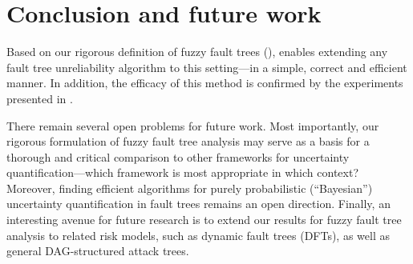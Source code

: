 \documentclass[runningheads]{llncs}
\newcommand{\MS}[1]{{\color{blue}\textbf{Mariëlle:} #1}}
\begin{document}
\section{Conclusion and future work}



Based on our rigorous definition of fuzzy fault trees (),  enables extending any fault tree unreliability algorithm to this setting---in a simple, correct and efficient manner. 
In addition, the efficacy of this method is confirmed by the experiments presented in .

There remain several open problems for future work. 
Most importantly, our rigorous formulation of fuzzy fault tree analysis may serve as a basis for a thorough and critical comparison to other frameworks for uncertainty quantification---which framework is most appropriate in which context?
Moreover, finding efficient algorithms for purely probabilistic (``Bayesian'') uncertainty quantification in fault trees remains an open direction. 
Finally, an interesting avenue for future research is to extend our results for fuzzy fault tree analysis to related risk models, such as dynamic fault trees (DFTs), as well as general DAG-structured attack trees. 


\end{document}
